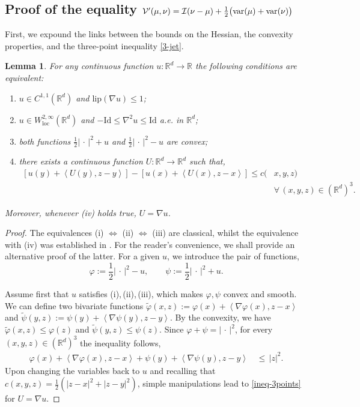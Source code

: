 \documentclass[11pt,letterpaper,reqno]{amsart}
\newtheorem{lemma}[theorem]{Lemma}
\theoremstyle{definition}
\numberwithin{equation}{section}
\def\f{\varphi}
\newcommand{\R}{\mathbb{R}}
\newcommand{\Rd}{\R^d}
\newcommand{\var}{{\rm{var}}}
\newcommand{\argu}{{\,\cdot\,}}
\newcommand{\pairing}[1]{{\left \langle #1 \right \rangle}}
\newcommand{\abs}[1]{{\left \lvert #1 \right \rvert}}
\newcommand{\Lip}{{\mathrm{lip}}}
\newcommand{\I}{\mathcal{I}}
\newcommand{\V}{{\mathcal{V}}}
\begin{document}
{\subsection{Proof of  the equality $\V'(\mu,\nu)= \I(\nu-\mu) + \frac1{2} \big(\var (\mu)+\var(\nu)\big)$} \label{IversusW}
{First, we expound the links  between the bounds on the Hessian, the convexity properties, and the three-point inequality \eqref{3-jet}.}
\begin{lemma}
	\label{lipConv}
	For any continuous function $u: \Rd \to \R$ the following conditions are equivalent:
	\begin{enumerate}[label={(\roman*)}] 
		\item $u \in C^{1,1}(\Rd)$ and $\Lip(\nabla u) \leq 1$;
		\label{phi_C11}
		\item \label{hessian} $u \in W^{2,\infty}_{\mathrm{loc}}(\Rd)$ and $-\mathrm{Id} \leq \nabla^2 u \leq \mathrm{Id}$ a.e. in $\Rd$; 
		\item \label{both_convex} both functions $ \frac{1}{2}\abs{\argu}^2 +u$ and $\frac{1}{2}\abs{\argu}^2 - u$ are convex;
		\item there exists a continuous function $U:\Rd \to\Rd$ such that, 
		\begin{align}\label{ineq-3points}
			[u(y) + \pairing{U(y), z-y}]  - [u(x) + \pairing{U(x), z-x} ]
			\le c(&x,y,z) \\
			\nonumber
			&\forall\, (x,y, z) \in (\Rd)^3 .
		\end{align}
	\end{enumerate}
	Moreover, whenever (iv) holds true, $U = \nabla u$.
\end{lemma}
\begin{proof}
	The equivalences (i) $\Leftrightarrow$ (ii) $\Leftrightarrow$ (iii) are classical, whilst the equivalence with (iv) was established in \cite{legruyer2009}. For the reader's convenience, we shall provide an alternative proof of the latter. For a given $u$, we introduce the pair of functions,
	\begin{equation}
		\label{phipsi}
		\varphi:= \frac1{2} \abs{\argu}^2 - u, \qquad   \psi:= \frac1{2} \abs{\argu}^2 + u.
	\end{equation}
	
	Assume first that $u$ satisfies (i),\,(ii),\,(iii), which makes $\varphi,\psi$ convex and smooth. We can define two bivariate functions
	$  {\tilde \f}(x,z) := \f(x) + \pairing{ \nabla\f(x), z-x}$ and 
	${\tilde \psi}(y,z) := \psi(y) + \pairing{ \nabla\psi(y), z-y}.$
	By the convexity, we have  $  {\tilde \f}(x,z) \leq \f(z)$ and $ {\tilde \psi}(y,z) \leq \psi(z)$. Since $\varphi + \psi = \abs{\argu}^2$, for every $(x,y,z)\in (\R^d)^3 $ the inequality follows,
		\begin{align*}
		\f(x) + \pairing{ \nabla\f(x), z-x} +  \psi(y) + \pairing{ \nabla\psi(y), z-y} &\, \le \, |z|^2.
	\end{align*}
	Upon changing the variables back to $u$ and recalling that $c(x,y,z)= \frac{1}{2} ( \abs{z-x}^2 + \abs{z-y}^2 )$, simple manipulations lead to \eqref{ineq-3points} for $U =\nabla u$.
	

\end{proof}}
\end{document}
